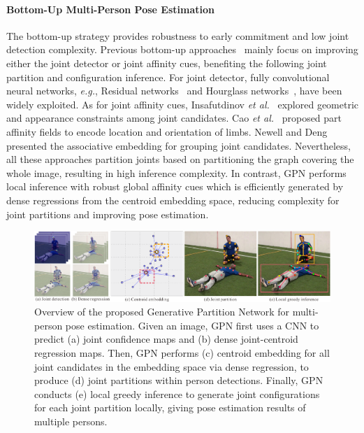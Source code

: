 \documentclass[10pt,twocolumn,letterpaper]{article}
\begin{document}
\paragraph{Bottom-Up Multi-Person Pose Estimation} The bottom-up strategy provides robustness to early commitment and low joint detection complexity. Previous
bottom-up approaches~\cite{cao2017realtime,hpe:deepercut_eccv16,newell2016associative,hpe:deepcut_cvpr16} mainly focus on improving either the joint detector or  joint affinity cues, benefiting the following
joint partition and configuration inference. For joint detector, fully convolutional neural networks, \emph{e.g.},
Residual networks~\cite{he2016deep} and Hourglass networks~\cite{hpe:hourglass_arxiv15}, have been widely exploited. As for joint affinity cues, Insafutdinov \emph{et al.}~\cite{hpe:deepercut_eccv16}
explored geometric and appearance constraints among joint candidates. Cao \emph{et al.}~\cite{cao2017realtime} proposed part affinity fields to encode location and orientation of limbs.
Newell and Deng~\cite{newell2016associative} presented the associative embedding for grouping joint candidates. Nevertheless, all these approaches partition joints  based on partitioning the
graph covering the whole image, resulting in high inference complexity. In contrast, GPN performs local inference with
robust global affinity cues which is efficiently  generated by dense regressions from the centroid embedding space, reducing complexity  for joint partitions and improving pose estimation.

\begin{figure}[t!]
\begin{center}
\includegraphics[scale=0.58]{figs/FlowChart_GPN.pdf}
\caption{Overview of the proposed Generative Partition Network for multi-person pose estimation. Given an image, GPN first uses a CNN to predict (a) joint confidence maps and (b) dense joint-centroid regression maps.
         Then, GPN performs (c) centroid embedding for all joint candidates in the embedding space via dense regression, to produce (d) joint partitions within person detections.
         Finally, GPN conducts (e) local greedy inference to generate joint configurations for each joint partition locally, giving pose estimation results of multiple persons.}
\label{fig:flowchart}
\end{center}
\vspace{-20pt}
\end{figure}
\end{document}
